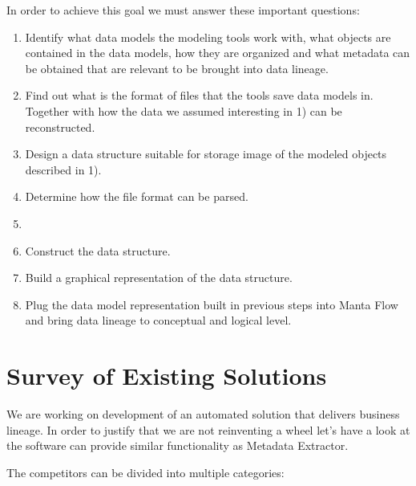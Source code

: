  In order to achieve this goal we must answer these important questions:
\begin{enumerate}
	\item Identify what data models the modeling tools work with, what objects are contained in the data models, how they are organized and what metadata can be obtained that are relevant to be brought into data lineage. 
	\item Find out what is the format of files that the tools save data models in. Together with how the data we assumed interesting in 1) can be reconstructed. 
	\item Design a data structure suitable for storage image of the modeled objects described in 1). 
	\item Determine how the file format can be parsed. 
	\item {}
	\item Construct the data structure. 
	\item Build a graphical representation of the data structure. 
	\item Plug the data model representation built in previous steps into Manta Flow and bring data lineage to conceptual and logical level. 
\end{enumerate}


\section{Survey of Existing Solutions}

We are working on development of an automated solution that delivers business lineage.
In order to justify that we are not reinventing a wheel let's have a look at the software can provide similar functionality as Metadata Extractor.

The competitors can be divided into multiple categories:

